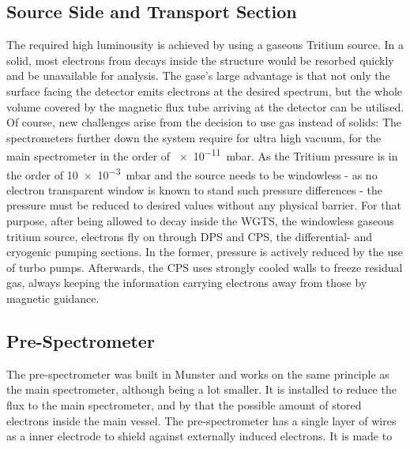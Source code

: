       \subsection{Source Side and Transport Section}
      \label{ch:The KATRIN experiment:sec:Experimental setup:subsec:sourceSide}
      The required high luminousity is achieved by using a gaseous Tritium source. In a solid, most electrons from decays inside the structure would be resorbed quickly and be unavailable for analysis. The gase's large advantage is that not only the surface facing the detector emits electrons at the desired spectrum, but the whole volume covered by the magnetic flux tube arriving at the detector can be utilised. Of course, new challenges arise from the decision to use gas instead of solids: The spectrometers further down the system require for ultra high vacuum, for the main spectrometer in the order of \SI{e-11}{\milli\bar}. As the Tritium pressure is in the order of \SI{10e-3}{\milli\bar} and the source needs to be windowless - as no electron transparent window is known to stand such pressure differences - the pressure must be reduced to desired values without any physical barrier. 
      For that purpose, after being allowed to decay inside the WGTS, the windowless gaseous tritium source, electrons fly on through DPS and CPS, the differential- and cryogenic pumping sections. In the former, pressure is actively reduced by the use of turbo pumps. Afterwards, the CPS uses strongly cooled walls to freeze residual gas, always keeping the information carrying electrons away from those by magnetic guidance.
      \subsection{Pre-Spectrometer}
      \label{ch:The KATRIN experiment:sec:Experimental setup:subsec:PreSpectrometer}
      The pre-spectrometer was built in Munster and works on the same principle as the main spectrometer, although being a lot smaller. It is installed to reduce the flux to the main spectrometer, and by that the possible amount of stored electrons inside the main vessel. The pre-spectrometer has a single layer of wires as a inner electrode to shield against externally induced electrons. It is made to 
